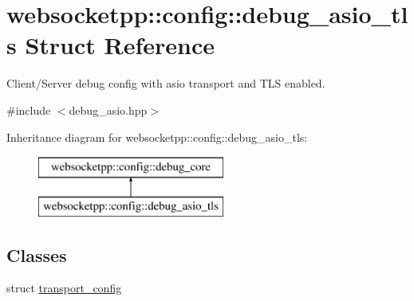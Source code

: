 \hypertarget{structwebsocketpp_1_1config_1_1debug__asio__tls}{}\section{websocketpp\+:\+:config\+:\+:debug\+\_\+asio\+\_\+tls Struct Reference}
\label{structwebsocketpp_1_1config_1_1debug__asio__tls}


Client/\+Server debug config with asio transport and T\+LS enabled.  




{\ttfamily \#include $<$debug\+\_\+asio.\+hpp$>$}

Inheritance diagram for websocketpp\+:\+:config\+:\+:debug\+\_\+asio\+\_\+tls\+:\begin{figure}[H]
\begin{center}
\leavevmode
\includegraphics[height=2.000000cm]{structwebsocketpp_1_1config_1_1debug__asio__tls}
\end{center}
\end{figure}
\subsection*{Classes}
\begin{DoxyCompactItemize}
\item 
struct \hyperlink{structwebsocketpp_1_1config_1_1debug__asio__tls_1_1transport__config}{transport\+\_\+config}
\end{DoxyCompactItemize}

